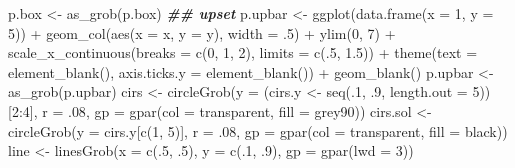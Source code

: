 \documentclass[
]{article}
\newenvironment{Shaded}{\begin{snugshade}}{\end{snugshade}}
\newcommand{\AttributeTok}[1]{\textcolor[rgb]{0.77,0.63,0.00}{#1}}
\newcommand{\DecValTok}[1]{\textcolor[rgb]{0.00,0.00,0.81}{#1}}
\newcommand{\DocumentationTok}[1]{\textcolor[rgb]{0.56,0.35,0.01}{\textbf{\textit{#1}}}}
\newcommand{\FloatTok}[1]{\textcolor[rgb]{0.00,0.00,0.81}{#1}}
\newcommand{\FunctionTok}[1]{\textcolor[rgb]{0.00,0.00,0.00}{#1}}
\newcommand{\NormalTok}[1]{#1}
\newcommand{\OtherTok}[1]{\textcolor[rgb]{0.56,0.35,0.01}{#1}}
\newcommand{\SpecialCharTok}[1]{\textcolor[rgb]{0.00,0.00,0.00}{#1}}
\newcommand{\StringTok}[1]{\textcolor[rgb]{0.31,0.60,0.02}{#1}}
\begin{document}
\begin{Shaded}
\begin{Highlighting}[]
\NormalTok{p.box }\OtherTok{\textless{}{-}} \FunctionTok{as\_grob}\NormalTok{(p.box)}
\DocumentationTok{\#\# upset}
\NormalTok{p.upbar }\OtherTok{\textless{}{-}} \FunctionTok{ggplot}\NormalTok{(}\FunctionTok{data.frame}\NormalTok{(}\AttributeTok{x =} \DecValTok{1}\NormalTok{, }\AttributeTok{y =} \DecValTok{5}\NormalTok{)) }\SpecialCharTok{+}
  \FunctionTok{geom\_col}\NormalTok{(}\FunctionTok{aes}\NormalTok{(}\AttributeTok{x =}\NormalTok{ x, }\AttributeTok{y =}\NormalTok{ y), }\AttributeTok{width =}\NormalTok{ .}\DecValTok{5}\NormalTok{) }\SpecialCharTok{+}
  \FunctionTok{ylim}\NormalTok{(}\DecValTok{0}\NormalTok{, }\DecValTok{7}\NormalTok{) }\SpecialCharTok{+}
  \FunctionTok{scale\_x\_continuous}\NormalTok{(}\AttributeTok{breaks =} \FunctionTok{c}\NormalTok{(}\DecValTok{0}\NormalTok{, }\DecValTok{1}\NormalTok{, }\DecValTok{2}\NormalTok{), }\AttributeTok{limits =} \FunctionTok{c}\NormalTok{(.}\DecValTok{5}\NormalTok{, }\FloatTok{1.5}\NormalTok{)) }\SpecialCharTok{+}
  \FunctionTok{theme}\NormalTok{(}\AttributeTok{text =} \FunctionTok{element\_blank}\NormalTok{(),}
    \AttributeTok{axis.ticks.y =} \FunctionTok{element\_blank}\NormalTok{()) }\SpecialCharTok{+}
  \FunctionTok{geom\_blank}\NormalTok{()}
\NormalTok{p.upbar }\OtherTok{\textless{}{-}} \FunctionTok{as\_grob}\NormalTok{(p.upbar)}
\NormalTok{cirs }\OtherTok{\textless{}{-}} \FunctionTok{circleGrob}\NormalTok{(}\AttributeTok{y =}\NormalTok{ (cirs.y }\OtherTok{\textless{}{-}} \FunctionTok{seq}\NormalTok{(.}\DecValTok{1}\NormalTok{, .}\DecValTok{9}\NormalTok{, }\AttributeTok{length.out =} \DecValTok{5}\NormalTok{))[}\DecValTok{2}\SpecialCharTok{:}\DecValTok{4}\NormalTok{], }\AttributeTok{r =}\NormalTok{ .}\DecValTok{08}\NormalTok{,}
  \AttributeTok{gp =} \FunctionTok{gpar}\NormalTok{(}\AttributeTok{col =} \StringTok{\textquotesingle{}transparent\textquotesingle{}}\NormalTok{, }\AttributeTok{fill =} \StringTok{\textquotesingle{}grey90\textquotesingle{}}\NormalTok{))}
\NormalTok{cirs.sol }\OtherTok{\textless{}{-}} \FunctionTok{circleGrob}\NormalTok{(}\AttributeTok{y =}\NormalTok{ cirs.y[}\FunctionTok{c}\NormalTok{(}\DecValTok{1}\NormalTok{, }\DecValTok{5}\NormalTok{)], }\AttributeTok{r =}\NormalTok{ .}\DecValTok{08}\NormalTok{,}
  \AttributeTok{gp =} \FunctionTok{gpar}\NormalTok{(}\AttributeTok{col =} \StringTok{\textquotesingle{}transparent\textquotesingle{}}\NormalTok{, }\AttributeTok{fill =} \StringTok{\textquotesingle{}black\textquotesingle{}}\NormalTok{))}
\NormalTok{line }\OtherTok{\textless{}{-}} \FunctionTok{linesGrob}\NormalTok{(}\AttributeTok{x =} \FunctionTok{c}\NormalTok{(.}\DecValTok{5}\NormalTok{, .}\DecValTok{5}\NormalTok{), }\AttributeTok{y =} \FunctionTok{c}\NormalTok{(.}\DecValTok{1}\NormalTok{, .}\DecValTok{9}\NormalTok{), }\AttributeTok{gp =} \FunctionTok{gpar}\NormalTok{(}\AttributeTok{lwd =} \DecValTok{3}\NormalTok{))}

\end{Highlighting}
\end{Shaded}
\end{document}
